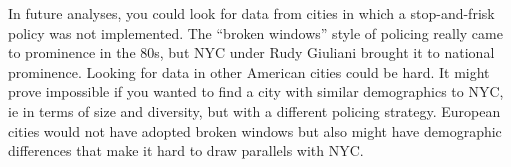 \documentclass{article}
\begin{document}
In future analyses, you could look for data from cities in which a stop-and-frisk policy was not implemented. The ``broken windows'' style of policing really came to prominence in the 80s, but NYC under Rudy Giuliani brought it to national prominence. Looking for data in other American cities could be hard. It might prove impossible if you wanted to find a city with similar demographics to NYC, ie in terms of size and diversity, but with a different policing strategy. European cities would not have adopted broken windows but also might have demographic differences that make it hard to draw parallels with NYC.
\end{document}
